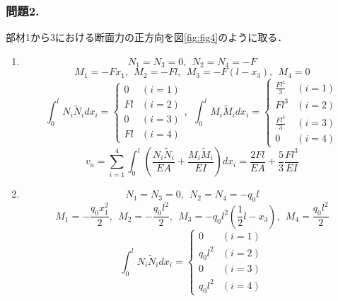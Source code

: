 \documentclass[10pt,a4j]{jarticle}
\begin{document}
\subsubsection*{問題2.}
部材1から3における断面力の正方向を図\ref{fig:fig4}のように取る．
\begin{enumerate}
\item
	\begin{equation}
		N_1=N_3=0, \ \ N_2=N_4=-F
	\end{equation}
	\begin{equation}
		M_1=-Fx_1, \ \ M_2=-Fl, \ \ M_3=-F(l-x_3), \ \ M_4=0
	\end{equation}
	\begin{equation}
		\int_0^l 
			N_i \tilde{N}_i dx_i = 
		\left\{
		\begin{array}{cc}
			0 & (i=1) \\
			Fl& (i=2) \\
			0 & (i=3) \\
			Fl & (i=4)
		\end{array}
		\right.
		, \ \
		\int_0^l 
			M_i \tilde{M}_i dx_i = 
		\left\{
		\begin{array}{cc}
			\frac{Fl^3}{3} & (i=1) \\
			Fl^3 & (i=2) \\
			\frac{Fl^3}{3} & (i=3) \\
			0 & (i=4)
		\end{array}
		\right.
	\end{equation}
	\begin{equation}
		v_a=
		\sum_{i=1}^4
		\int_0^l \left( \frac{N_i\tilde{N}_i}{EA} + \frac{M_i\tilde{M}_i}{EI} \right) dx_i
		=
		\frac{2Fl}{EA} + \frac{5}{3}\frac{Fl^3}{EI}
		\label{eqn:}
	\end{equation}
\item
	\begin{equation}
		N_1=N_3=0, \ \ N_2=N_4=-q_0l
	\end{equation}
	\begin{equation}
		M_1=-\frac{q_0x_1^2}{2}, \ \ M_2=-\frac{q_0l^2}{2}, \ \ M_3=-q_0l^2\left(\frac{1}{2}l-x_3\right), \ \ M_4=\frac{q_0l^2}{2}
	\end{equation}
	\begin{equation}
		\int_0^l 
			N_i \tilde{N}_i dx_i = 
		\left\{
		\begin{array}{cc}
			0 & (i=1) \\
			q_0l^2& (i=2) \\
			0 & (i=3) \\
			q_0l^2 & (i=4)
		\end{array}

\end{equation}
\end{enumerate}
\end{document}

